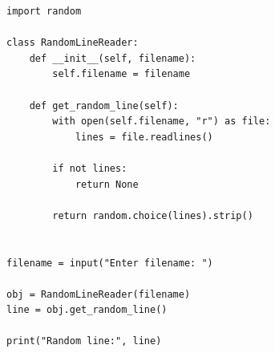 \begin{verbatim}
import random

class RandomLineReader:
    def __init__(self, filename):
        self.filename = filename

    def get_random_line(self):
        with open(self.filename, "r") as file:
            lines = file.readlines()

        if not lines:
            return None

        return random.choice(lines).strip()


filename = input("Enter filename: ")

obj = RandomLineReader(filename)
line = obj.get_random_line()

print("Random line:", line)
\end{verbatim}